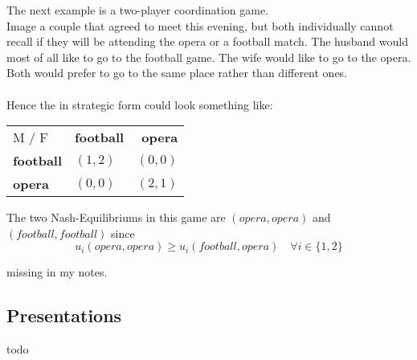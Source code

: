 \begin{example} \label{battleofthesexes}
		The next example is a two-player coordination game. \\
		Image a couple that agreed to meet this evening, but both individually cannot recall if they will be attending the opera or a football match. The husband would most of all like to go to the football game. The wife would like to go to the opera. Both would prefer to go to the same place rather than different ones. \\ \\
		Hence the  in strategic form could look something like:
		
		\begin{center}
			\begin{tabular}{|l|l|r|}
				\hline\hline
  					M / F & \textbf{football} & \textbf{opera} \\
         				\cline{1-3}
   					\textbf{football} & $(1, 2)$ & $(0, 0)$ 	\arrayrulewidth2pt \\
            			\cline{1-3}
   					\textbf{opera} & $(0, 0)$ & $(2, 1)$ \\ \hline\hline
			\end{tabular}	
		\end{center}
		
		The two Nash-Equilibriums in this game are $(opera, opera)$ and $(football, football)$ since
		\[ u_{i}(opera, opera) \geq u_{i}(football, opera) \quad \forall i \in \{ 1, 2 \} \]
\end{example}

\begin{example}
	missing in my notes. %
\end{example}

\subsection{Presentations}
todo %

\newpage